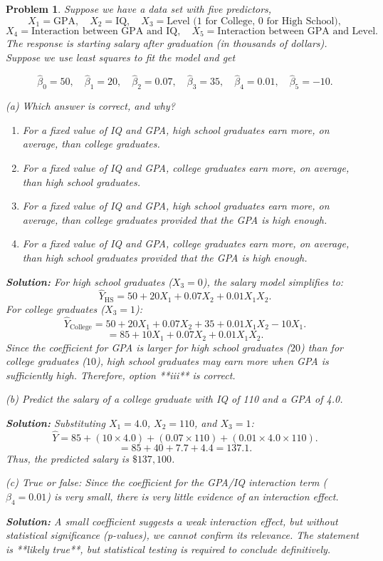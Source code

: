 \documentclass[12pt]{article}
\newtheorem{problem}{Problem} %
\theoremstyle{definition}
\newcommand{\solution}{\textcolor{PineGreen}{\textbf{Solution:}}\newline}
\begin{document}
\begin{problem}
Suppose we have a data set with five predictors, 
\[
X_1 = \text{GPA}, \quad X_2 = \text{IQ}, \quad X_3 = \text{Level (1 for College, 0 for High School)},
\]
\[
X_4 = \text{Interaction between GPA and IQ}, \quad X_5 = \text{Interaction between GPA and Level}.
\]
The response is starting salary after graduation (in thousands of dollars). Suppose we use least squares to fit the model and get

\[
\hat{\beta}_0 = 50, \quad \hat{\beta}_1 = 20, \quad \hat{\beta}_2 = 0.07, \quad \hat{\beta}_3 = 35, \quad \hat{\beta}_4 = 0.01, \quad \hat{\beta}_5 = -10.
\]

(a) Which answer is correct, and why?
\begin{enumerate}
    \item[i.] For a fixed value of IQ and GPA, high school graduates earn more, on average, than college graduates.
    \item[ii.] For a fixed value of IQ and GPA, college graduates earn more, on average, than high school graduates.
    \item[iii.] For a fixed value of IQ and GPA, high school graduates earn more, on average, than college graduates provided that the GPA is high enough.
    \item[iv.] For a fixed value of IQ and GPA, college graduates earn more, on average, than high school graduates provided that the GPA is high enough.
\end{enumerate}

\solution
For high school graduates (\(X_3 = 0\)), the salary model simplifies to:
\[
\hat{Y}_{\text{HS}} = 50 + 20 X_1 + 0.07 X_2 + 0.01 X_1 X_2.
\]
For college graduates (\(X_3 = 1\)):
\[
\hat{Y}_{\text{College}} = 50 + 20 X_1 + 0.07 X_2 + 35 + 0.01 X_1 X_2 - 10 X_1.
\]
\[
= 85 + 10 X_1 + 0.07 X_2 + 0.01 X_1 X_2.
\]
Since the coefficient for GPA is larger for high school graduates (\(20\)) than for college graduates (\(10\)), high school graduates may earn more when GPA is sufficiently high. Therefore, option **iii** is correct.

\bigskip

(b) Predict the salary of a college graduate with IQ of 110 and a GPA of 4.0.

\bigskip

\solution
Substituting \(X_1 = 4.0\), \(X_2 = 110\), and \(X_3 = 1\):
\[
\hat{Y} = 85 + (10 \times 4.0) + (0.07 \times 110) + (0.01 \times 4.0 \times 110).
\]
\[
= 85 + 40 + 7.7 + 4.4 = 137.1.
\]
Thus, the predicted salary is \(\$137,100\).

\bigskip

(c) True or false: Since the coefficient for the GPA/IQ interaction term (\(\beta_4 = 0.01\)) is very small, there is very little evidence of an interaction effect.

\bigskip

\solution
A small coefficient suggests a weak interaction effect, but without statistical significance (p-values), we cannot confirm its relevance. The statement is **likely true**, but statistical testing is required to conclude definitively.
\end{problem}
\end{document}

